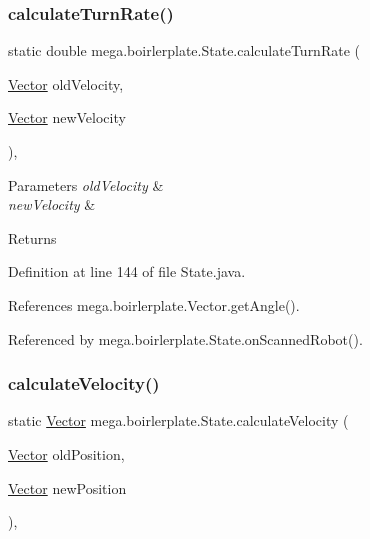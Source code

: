 \subsubsection{\texorpdfstring{calculate\+Turn\+Rate()}{calculateTurnRate()}}
{\footnotesize\ttfamily static double mega.\+boirlerplate.\+State.\+calculate\+Turn\+Rate (\begin{DoxyParamCaption}\item[{\hyperlink{classmega_1_1boirlerplate_1_1_vector}{Vector}}]{old\+Velocity,  }\item[{\hyperlink{classmega_1_1boirlerplate_1_1_vector}{Vector}}]{new\+Velocity }\end{DoxyParamCaption})\hspace{0.3cm}{\ttfamily [static]}, {\ttfamily [private]}}


\begin{DoxyParams}{Parameters}
{\em old\+Velocity} & \\
\hline
{\em new\+Velocity} & \\
\hline
\end{DoxyParams}
\begin{DoxyReturn}{Returns}

\end{DoxyReturn}


Definition at line 144 of file State.\+java.



References mega.\+boirlerplate.\+Vector.\+get\+Angle().



Referenced by mega.\+boirlerplate.\+State.\+on\+Scanned\+Robot().

\mbox{\label{classmega_1_1boirlerplate_1_1_state_aca2f99643fa4c2d6f45a2230f56ecba2}} 
\subsubsection{\texorpdfstring{calculate\+Velocity()}{calculateVelocity()}}
{\footnotesize\ttfamily static \hyperlink{classmega_1_1boirlerplate_1_1_vector}{Vector} mega.\+boirlerplate.\+State.\+calculate\+Velocity (\begin{DoxyParamCaption}\item[{\hyperlink{classmega_1_1boirlerplate_1_1_vector}{Vector}}]{old\+Position,  }\item[{\hyperlink{classmega_1_1boirlerplate_1_1_vector}{Vector}}]{new\+Position }\end{DoxyParamCaption})\hspace{0.3cm}{\ttfamily [static]}, {\ttfamily [private]}}


